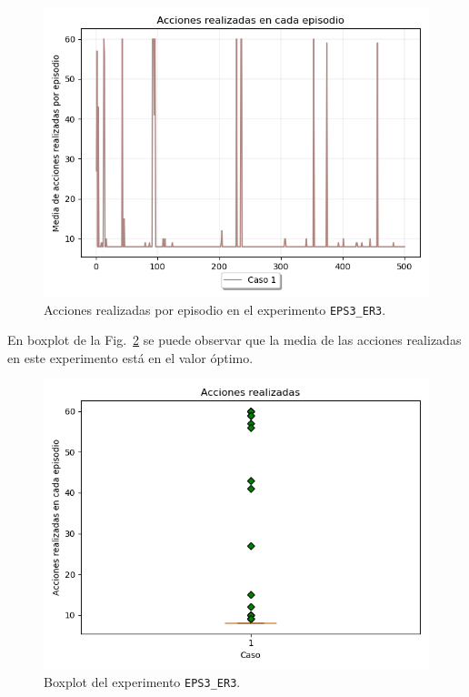 \begin{figure}
    \centering
    \includegraphics[scale=0.4]{cap5_experimentacion/images/dim5_lr0.01_ep0.2_acciones.png}
    \caption{Acciones realizadas por episodio en el experimento \texttt{EPS3\_ER3}.}
    \label{fig:dim5_lr0.01_ep0.2_acciones_EPS2_ER3}
\end{figure}

En boxplot de la Fig.~\ref{fig:dim5_lr0.01_ep0.2_boxplot_EPS2_ER3} se puede observar que la media de las acciones realizadas en este experimento está en el valor óptimo. 

\begin{figure}
    \centering
    \includegraphics[scale=0.4]{cap5_experimentacion/images/dim5_lr0.01_ep0.2_boxplot.png}
    \caption{Boxplot del experimento \texttt{EPS3\_ER3}.}
    \label{fig:dim5_lr0.01_ep0.2_boxplot_EPS2_ER3}
\end{figure}

